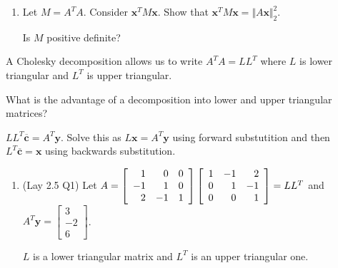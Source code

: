 \documentclass[12pt,letterpaper,noanswers]{exam}
\begin{document}
\begin{enumerate}[resume]
\item Let $M = A^TA$. Consider $\mathbf{x}^TM\mathbf{x}$.  Show that $\mathbf{x}^TM\mathbf{x} = \Vert A\mathbf{x}\Vert_2^2$.  

Is $M$ positive definite?
\end{enumerate}



A Cholesky decomposition allows us to write $A^TA = LL^T$ where $L$ is lower triangular and $L^T$ is upper triangular.  

What is the advantage of a decomposition into lower and upper triangular matrices?

$LL^T\overline{\mathbf{c}} = A^T\mathbf{y}$. Solve this as $L\mathbf{x} = A^T\mathbf{y}$ using forward substutition and then $L^T\overline{\mathbf{c}} = \mathbf{x}$ using backwards substitution.

\begin{enumerate}[resume]
\item (Lay 2.5 Q1) Let $A = \left[\begin{array}{r r r}
1 & 0 & 0 \\
-1 & 1 & 0 \\
2 & -1 & 1
\end{array}\right]
\left[\begin{array}{r r r}
1 & -1 & 2 \\
0 & 1 & -1 \\
0 & 0 & 1
\end{array}\right] = LL^T$ and $A^T\mathbf{y} = \left[\begin{array}{r} 3 \\ -2\\ 6\end{array}\right]$. 

$L$ is a lower triangular matrix and $L^T$ is an upper triangular one.  
\end{enumerate}
\end{document}
